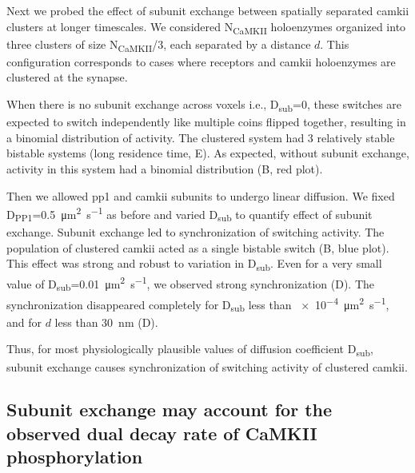 \documentclass[9pt,lineno,doublespacing]{elife}
\newcommand\SUB[2]{#1\textsubscript{#2}}
\begin{document}
Next we probed the effect of subunit exchange between spatially separated
\gls{camkii} clusters at longer timescales. We considered \SUB{N}{CaMKII}
holoenzymes organized into three clusters of size \SUB{N}{CaMKII}/3, each
separated by a distance \(d\). This configuration corresponds to cases where
receptors and \gls{camkii} holoenzymes are clustered at the synapse. 

When there is no subunit exchange across voxels i.e., \SUB{D}{sub}=0, these
switches are expected to switch independently like multiple coins flipped
together, resulting in a binomial distribution of activity. The clustered system
had 3 relatively stable bistable systems (long residence time,
E). As expected, without subunit exchange, activity in
this system had a binomial distribution (B, red plot). 

Then we allowed \gls{pp1} and \gls{camkii} subunits to undergo linear diffusion.
We fixed \SUB{D}{PP1}=\SI{0.5}{\micro\meter\squared\per\second} as before and
varied \SUB{D}{sub} to quantify effect of subunit exchange.  Subunit exchange
led to synchronization of switching activity. The population of clustered
\gls{camkii} acted as a single bistable switch (B, blue plot).
This effect was strong and robust to variation in \SUB{D}{sub}. Even for a very
small value of \SUB{D}{sub}=\SI{0.01}{\micro\meter\squared\per\second}, we
observed strong synchronization (D). The synchronization
disappeared completely for \SUB{D}{sub} less than
\SI{e-4}{\micro\meter\squared\per\second}, and  for $d$ less than
\SI{30}{\nano\meter} (D).

Thus, for most physiologically plausible values of diffusion coefficient
\SUB{D}{sub}, subunit exchange causes synchronization of switching activity of
clustered \gls{camkii}.

\subsection{Subunit exchange may account for the observed dual decay rate of
    CaMKII phosphorylation}\label{subsec:camkii_decay_two_time_course}
\end{document}
